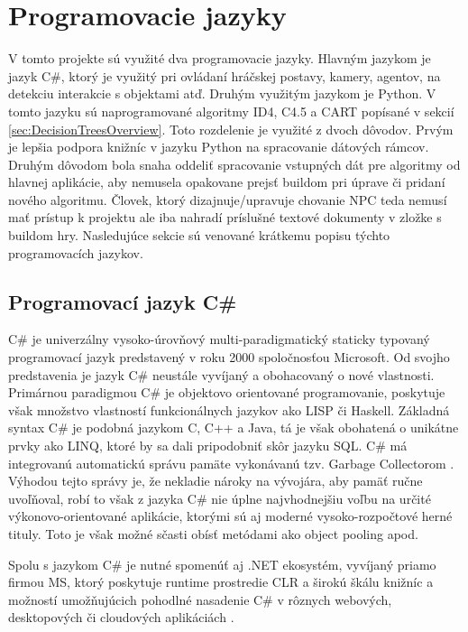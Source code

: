 \documentclass[slovak, master]{diploma}
\begin{document}
\section{Programovacie jazyky}
\label{sec:langs}
V tomto projekte sú využité dva programovacie jazyky. Hlavným jazykom je jazyk C\#, ktorý je využitý pri ovládaní hráčskej postavy, kamery, agentov, na detekciu interakcie s objektami atď. Druhým využitým jazykom je Python. V tomto jazyku sú naprogramované algoritmy ID4, C4.5 a CART popísané v sekcií \ref{sec:DecisionTreesOverview}. Toto rozdelenie je využité z dvoch dôvodov. Prvým je lepšia podpora knižníc v jazyku Python na spracovanie dátových rámcov. Druhým dôvodom bola snaha oddeliť spracovanie vstupných dát pre algoritmy od hlavnej aplikácie, aby nemusela opakovane prejsť buildom pri úprave či pridaní nového algoritmu. Človek, ktorý dizajnuje/upravuje chovanie NPC teda nemusí mať prístup k projektu ale iba nahradí príslušné textové dokumenty v zložke s buildom hry. Nasledujúce sekcie sú venované krátkemu popisu týchto programovacích jazykov.

\subsection{Programovací jazyk C\#}
\label{sec:langsCShartp}
C\# je univerzálny vysoko-úrovňový multi-paradigmatický staticky typovaný programovací jazyk predstavený v roku 2000 spoločnosťou Microsoft. Od svojho predstavenia je jazyk C\# neustále vyvíjaný a obohacovaný o nové vlastnosti. Primárnou paradigmou C\# je objektovo orientované programovanie, poskytuje však množstvo vlastností funkcionálnych jazykov ako LISP či Haskell. Základná syntax C\# je podobná jazykom C, C++ a Java, tá je však obohatená o unikátne prvky ako LINQ, ktoré by sa dali pripodobniť skôr jazyku SQL. C\# má integrovanú automatickú správu pamäte vykonávanú tzv. Garbage Collectorom \cite{DotNetBook}. Výhodou tejto správy je, že nekladie nároky na vývojára, aby pamäť ručne uvoľňoval, robí to však z jazyka C\# nie úplne najvhodnejšiu voľbu na určité výkonovo-orientované aplikácie, ktorými sú aj moderné vysoko-rozpočtové herné tituly. Toto je však možné sčasti obísť metódami ako object pooling apod.

Spolu s jazykom C\# je nutné spomenúť aj .NET ekosystém, vyvíjaný priamo firmou MS, ktorý poskytuje runtime prostredie CLR a širokú škálu knižníc a možností umožňujúcich pohodlné nasadenie C\# v rôznych webových, desktopových či cloudových aplikáciách \cite{DotNetBook}.
\end{document}
